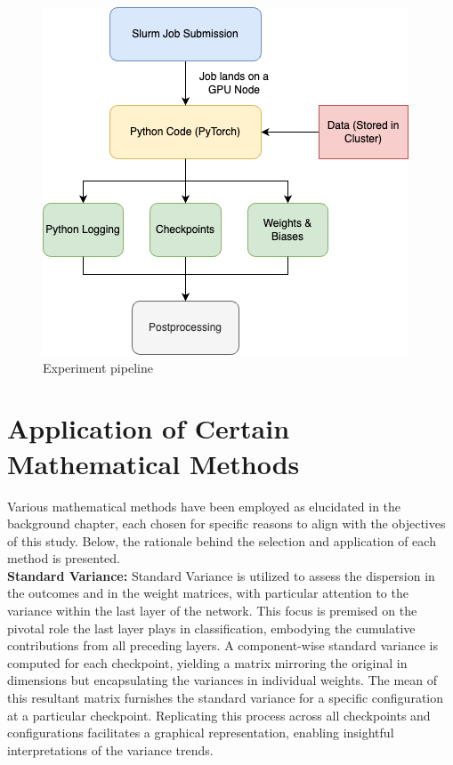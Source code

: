 \begin{figure}[htbp]
    \centerline{\includegraphics[scale=.5]{figures/Experiments_method.png}}
    \caption{Experiment pipeline}
    \label{fig:exp_pipeline}
\end{figure}



\section{Application of Certain Mathematical Methods}

Various mathematical methods have been employed as elucidated in the background chapter, each chosen for specific reasons to align with the objectives of this study. Below, the rationale behind the selection and application of each method is presented.\\

\textbf{Standard Variance:} 
Standard Variance is utilized to assess the dispersion in the outcomes and in the weight matrices, with particular attention to the variance within the last layer of the network. This focus is premised on the pivotal role the last layer plays in classification, embodying the cumulative contributions from all preceding layers. A component-wise standard variance is computed for each checkpoint, yielding a matrix mirroring the original in dimensions but encapsulating the variances in individual weights. The mean of this resultant matrix furnishes the standard variance for a specific configuration at a particular checkpoint. Replicating this process across all checkpoints and configurations facilitates a graphical representation, enabling insightful interpretations of the variance trends.\\

